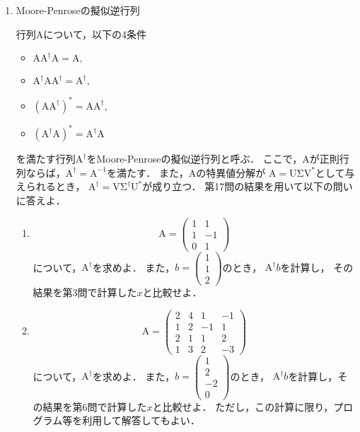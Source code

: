 \begin{enumerate}[label=問\arabic*.]
  \item Moore-Penroseの擬似逆行列

  \vspace{1mm}
  行列$\mathrm{A}$について，以下の4条件
  \begin{itemize}
    \item $\mathrm{A}\mathrm{A}^{\dagger}\mathrm{A}=\mathrm{A},$
    \item $\mathrm{A}^{\dagger}\mathrm{A}\mathrm{A}^{\dagger}=\mathrm{A}^{\dagger},$
    \item $(\mathrm{A}\mathrm{A}^{\dagger})^*=\mathrm{A}\mathrm{A}^{\dagger},$
    \item $(\mathrm{A}^{\dagger}\mathrm{A})^*=\mathrm{A}^{\dagger}\mathrm{A}$
  \end{itemize}
  を満たす行列$\mathrm{A}^{\dagger}$をMoore-Penroseの擬似逆行列と呼ぶ．
  ここで，$\mathrm{A}$が正則行列ならば，$\mathrm{A}^{\dagger}=\mathrm{A}^{-1}$を満たす．
  また，$\mathrm{A}$の特異値分解が
  $\mathrm{A}=\mathrm{U}\mathrm{\Sigma}\mathrm{V}^*$として与えられるとき，
  $\mathrm{A}^{\dagger}=\mathrm{V}\mathrm{\Sigma}^{\dagger}\mathrm{U}^*$が成り立つ．
  第17問の結果を用いて以下の問いに答えよ．
  \begin{enumerate}[label=(\roman*)]
    \item
      \begin{equation}
        \mathrm{A} = \left(
          \begin{array}{rr}
            1 & 1 \\
            1 & -1 \\
            0 & 1
          \end{array}
          \right)
      \end{equation}
      について，$\mathrm{A}^{\dagger}$を求めよ．
      また，$b=\left( \begin{array}{r} 1 \\ 1 \\ 2 \end{array} \right)$のとき，
      $\mathrm{A}^{\dagger} b$を計算し，
      その結果を第3問で計算した$x$と比較せよ．
    \item
      \begin{equation}
        \mathrm{A} = \left(
          \begin{array}{rrrr}
            2 & 4 & 1 & -1 \\
            1 & 2 & -1 & 1 \\
            2 & 1 & 1 & 2 \\
            1 & 3 & 2 & -3
          \end{array}
          \right)
      \end{equation}
      について，$\mathrm{A}^{\dagger}$を求めよ．
      また，$b=\left( \begin{array}{r} 1 \\ 2 \\ -2 \\ 0 \end{array} \right)$のとき，
      $\mathrm{A}^{\dagger} b$を計算し，その結果を第6問で計算した$x$と比較せよ．
      ただし，この計算に限り，プログラム等を利用して解答してもよい．
  \end{enumerate}
  
\end{enumerate}